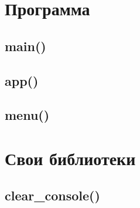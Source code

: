 \documentclass[12pt, a4paper]{article}
\begin{document}
\section{Программа}



\subsection{main()}







\subsection{app()}







\subsection{menu()}











\section{Свои библиотеки}



\subsection{clear\_console()}




\end{document}
